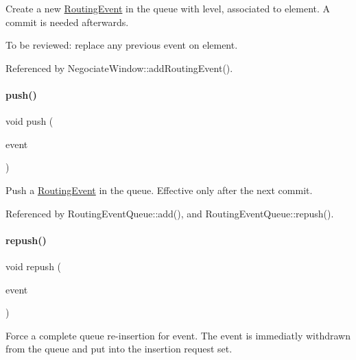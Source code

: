 Create a new \mbox{\hyperlink{classKite_1_1RoutingEvent}{Routing\+Event}} in the queue with {\ttfamily level}, associated to {\ttfamily element}. A commit is needed afterwards.

To be reviewed\+: replace any previous event on element. 

Referenced by Negociate\+Window\+::add\+Routing\+Event().

\mbox{\label{classKite_1_1RoutingEventQueue_ac802427673567526d06af911e94f7216}} 
\paragraph{\texorpdfstring{push()}{push()}}
{\footnotesize\ttfamily void push (\begin{DoxyParamCaption}\item[{\mbox{\hyperlink{classKite_1_1RoutingEvent}{Routing\+Event}} $\ast$}]{event }\end{DoxyParamCaption})\hspace{0.3cm}{\ttfamily [inline]}}

Push a \mbox{\hyperlink{classKite_1_1RoutingEvent}{Routing\+Event}} in the queue. Effective only after the next commit. 

Referenced by Routing\+Event\+Queue\+::add(), and Routing\+Event\+Queue\+::repush().

\mbox{\label{classKite_1_1RoutingEventQueue_afd2fa6d6f5d90c472bea9befa97d955d}} 
\paragraph{\texorpdfstring{repush()}{repush()}}
{\footnotesize\ttfamily void repush (\begin{DoxyParamCaption}\item[{\mbox{\hyperlink{classKite_1_1RoutingEvent}{Routing\+Event}} $\ast$}]{event }\end{DoxyParamCaption})}

Force a complete queue re-\/insertion for {\ttfamily event}. The event is immediatly withdrawn from the queue and put into the insertion request set.

